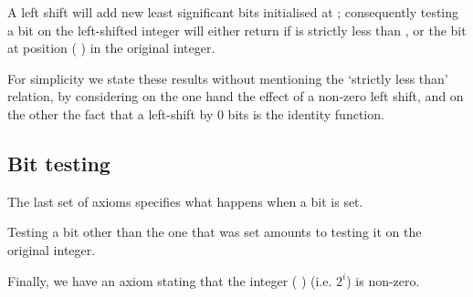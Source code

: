 
A left shift will add  new least significant bits initialised
at ; consequently testing a bit  on the left-shifted
integer will either return  if  is strictly less than
, or the bit at position ( \IdrisFunction{-} )
in the original integer.

For simplicity we state these results without mentioning the `strictly less than'
relation, by considering on the one hand the effect of a non-zero left shift,
and on the other the fact that a left-shift by 0 bits is the identity function.


\subsection{Bit testing}

The last set of axioms specifies what happens when a bit is set.

Testing a bit other than the one that was set amounts to testing it on the
original integer.


Finally, we have an axiom stating that the integer
( ) (i.e. $2^i$) is non-zero.

